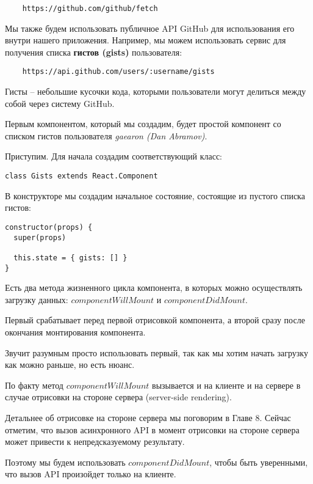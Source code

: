 \begin{lstlisting}
	https://github.com/github/fetch
\end{lstlisting}

Мы также будем использовать публичное API GitHub для использования его внутри нашего приложения. Например, мы можем использовать сервис для получения списка \textbf{гистов (gists)} пользователя:

\begin{lstlisting}
	https://api.github.com/users/:username/gists
\end{lstlisting}

Гисты -- небольшие кусочки кода, которыми пользователи могут делиться между собой через систему GitHub.

Первым компонентом, который мы создадим, будет простой компонент со списком гистов пользователя \textit{gaearon (Dan Abramov)}.

Приступим. Для начала создадим соответствующий класс:

\begin{lstlisting}
class Gists extends React.Component
\end{lstlisting}

В конструкторе мы создадим начальное состояние, состоящие из пустого списка гистов:

\begin{lstlisting}
constructor(props) {
  super(props)
  
  this.state = { gists: [] }
}
\end{lstlisting}

Есть два метода жизненного цикла компонента, в которых можно осуществлять загрузку данных: $componentWillMount$ и $componentDidMount$.

Первый срабатывает перед первой отрисовкой компонента, а второй сразу после окончания монтирования компонента.

Звучит разумным просто использовать первый, так как мы хотим начать загрузку как можно раньше, но есть нюанс.

По факту метод $componentWillMount$ вызывается и на клиенте и на сервере в случае отрисовки на стороне сервера (server-side rendering). 

Детальнее об отрисовке на стороне сервера мы поговорим в Главе 8. Сейчас отметим, что вызов асинхронного API в момент отрисовки на стороне сервера может привести к непредсказуемому результату.

Поэтому мы будем использовать $componentDidMount$, чтобы быть уверенными, что вызов API произойдет только на клиенте.

